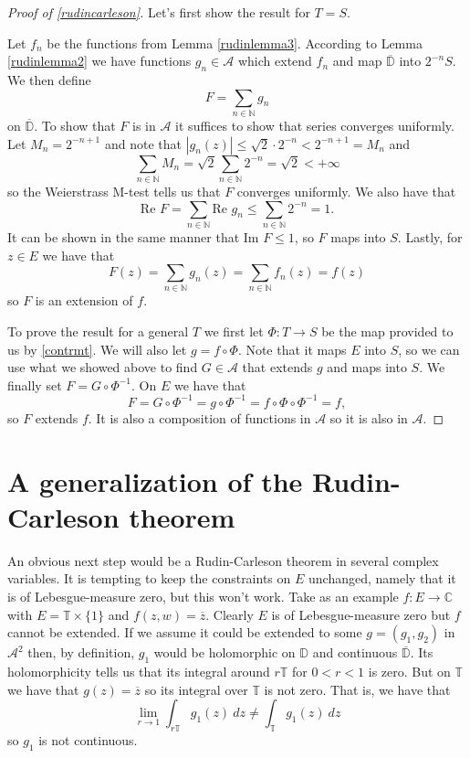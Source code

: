 \documentclass[a4paper,12pt,twoside,BCOR=10mm]{scrbook}
\theoremstyle{definition}
\theoremstyle{definition}
\theoremstyle{definition}
\renewcommand{\Re}{\text{Re }}
\renewcommand{\Im}{\text{Im }}
\begin{document}
\begin{proof}[Proof of \ref{rudincarleson}]
Let's first show the result for $T = S$.

Let $f_n$ be the functions from Lemma \ref{rudinlemma3}.
According to Lemma \ref{rudinlemma2} we have functions $g_n \in \mathcal{A}$ which extend $f_n$ and map $\overline{\mathbb{D}}$ into $2^{-n}S$.
We then define
\[
	F = \sum_{n \in \mathbb{N}} g_n
\]
on $\overline{\mathbb{D}}$.
To show that $F$ is in $\mathcal{A}$ it suffices to show that series converges uniformly.
Let $M_n = 2^{-n + 1}$ and note that $|g_n(z)| \leq \sqrt{2}\cdot 2^{-n} < 2^{-n + 1} = M_n$ and
\[
	\sum_{n \in \mathbb{N}} M_n
	=
	\sqrt{2}\sum_{n \in \mathbb{N}} 2^{-n} =
	\sqrt{2} < +\infty
\]
so the Weierstrass M-test tells us that $F$ converges uniformly.
We also have that
\[
	\Re F = \sum_{n \in \mathbb{N}} \Re g_n \leq \sum_{n \in \mathbb{N}} 2^{-n} = 1.
\]
It can be shown in the same manner that $\Im F \leq 1$, so $F$ maps into $S$.
Lastly, for $z \in E$ we have that
\[
	F(z) = \sum_{n \in \mathbb{N}} g_n(z) = \sum_{n \in \mathbb{N}} f_n(z) = f(z)
\]
so $F$ is an extension of $f$.

To prove the result for a general $T$ we first let $\Phi: T \rightarrow S$ be the map provided to us by \ref{contrmt}.
We will also let $g = f \circ \Phi$.
Note that it maps $E$ into $S$, so we can use what we showed above to find $G \in \mathcal{A}$ that extends $g$ and maps into $S$.
We finally set $F = G \circ \Phi^{-1}$.
On $E$ we have that
\[
	F = G \circ \Phi^{-1} = g \circ \Phi^{-1} = f \circ \Phi \circ \Phi^{-1} = f,
\]
so $F$ extends $f$.
It is also a composition of functions in $\mathcal{A}$ so it is also in $\mathcal{A}$.
\end{proof}



\section{A generalization of the Rudin-Carleson theorem}
\label{section3}
An obvious next step would be a Rudin-Carleson theorem in several complex variables.
It is tempting to keep the constraints on $E$ unchanged, namely that it is of Lebesgue-measure zero, but this won't work.
Take as an example $f: E \rightarrow \mathbb{C}$ with $E = \mathbb{T} \times \{1\}$ and $f(z, w) = \overline{z}$.
Clearly $E$ is of Lebesgue-measure zero but $f$ cannot be extended.
If we assume it could be extended to some $g = (g_1, g_2)$ in $\mathcal{A}^2$ then, by definition, $g_1$ would be holomorphic on $\mathbb{D}$ and continuous $\overline{\mathbb{D}}$.
Its holomorphicity tells us that its integral around $r\mathbb{T}$ for $0 < r < 1$ is zero.
But on $\mathbb{T}$ we have that $g(z) = \overline{z}$ so its integral over $\mathbb{T}$ is not zero.
That is, we have that
\[
	\lim_{r \rightarrow 1} \int_{r\mathbb{T}} g_1(z)\ dz \neq \int_{\mathbb{T}} g_1(z)\ dz
\]
so $g_1$ is not continuous.
\end{document}
